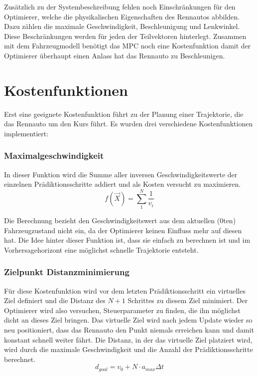 \documentclass{like}
\begin{document}
Zusätzlich zu der Systembeschreibung fehlen noch Einschränkungen für den Optimierer, welche die physikalischen Eigenschaften des Rennautos abbilden.
Dazu zählen die maximale Geschwindigkeit, Beschleunigung und Lenkwinkel. 
Diese Beschränkungen werden für jeden der Teilvektoren hinterlegt. 
Zusammen mit dem Fahrzeugmodell benötigt das \ac{MPC} noch eine Kostenfunktion damit der Optimierer überhaupt einen Anlass hat das Rennauto zu Beschleunigen.


\section{Kostenfunktionen}
\label{costFunctions}
Erst eine geeignete Kostenfunktion führt zu der Planung einer Trajektorie, die das Rennauto um den Kurs führt. Es wurden drei verschiedene Kostenfunktionen implementiert:

\subsubsection*{Maximalgeschwindigkeit}  
In dieser Funktion wird die Summe aller inversen Geschwindigkeitswerte der einzelnen Prädiktionsschritte addiert und als Kosten versucht zu maximieren. \\
\begin{equation}
	f(\vec{X}) =  \sum_{1}^{N} \frac{1}{v_i}
\end{equation}

Die Berechnung bezieht den Geschwindigkeitswert aus dem aktuellen (0ten) Fahrzeugzustand nicht ein, da der Optimierer keinen Einfluss mehr auf diesen hat. Die Idee hinter dieser Funktion ist, dass sie einfach zu berechnen ist und im Vorhersagehorizont eine möglichst schnelle Trajektorie entsteht.

\subsubsection*{Zielpunkt Distanzminimierung}
Für diese Kostenfunktion wird vor dem letzten Prädiktionsschritt ein virtuelles Ziel definiert und die Distanz des $N+1$ Schrittes zu diesem Ziel minimiert. Der Optimierer wird also versuchen, Steuerparameter zu finden, die ihn möglichst dicht an dieses Ziel bringen. Das virtuelle Ziel wird nach jedem Update wieder so neu positioniert, dass das Rennauto den Punkt niemals erreichen kann und damit konstant schnell weiter fährt. Die Distanz, in der das virtuelle Ziel platziert wird, wird durch die maximale Geschwindigkeit und die Anzahl der Prädiktionsschritte berechnet. 
\begin{equation}
	d_{goal} = v_0 + N \cdot a_{max}  \Delta t
\end{equation}
\end{document}
